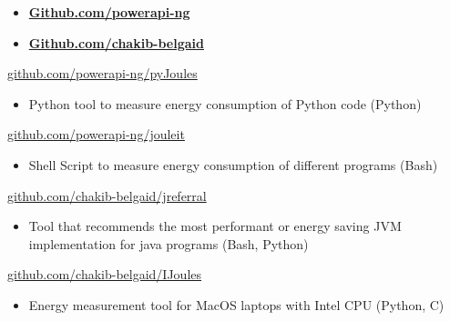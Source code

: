 \documentclass[10pt,a4paper,ragged2e,withhyper]{altacv}
\begin{document}
\begin{paracol}{2}



  \begin{itemize}
    \item   \textbf{\color{accent}\href{https://github.com/powerapi-ng}
            {Github.com/powerapi-ng}}
    \item \textbf{\color{accent}\href{https://github.com/chakib-belgaid}
            {Github.com/chakib-belgaid}}
  \end{itemize}

  \divider
   {\href{https://github.com/powerapi-ng/pyJoules}{github.com/powerapi-ng/pyJoules}}{}{}
  \begin{itemize}
    \item  Python tool to measure energy consumption of Python code (Python)
  \end{itemize}

  \divider
   {\href{https://github.com/powerapi-ng/jouleit}{github.com/powerapi-ng/jouleit}}{}{}
  \begin{itemize}
    \item  Shell Script to measure energy consumption of different programs (Bash)
  \end{itemize}

  \divider
   {\href{https://github.com/chakib-belgaid/jreferral}{github.com/chakib-belgaid/jreferral}}{}{}
  \begin{itemize}
    \item  Tool that recommends the most performant or energy saving JVM implementation for java programs (Bash, Python)
  \end{itemize}

  \divider
   {\href{https://github.com/chakib-belgaid/IJoules}{github.com/chakib-belgaid/IJoules}}{}{}
  \begin{itemize}
    \item  Energy measurement tool for MacOS laptops with Intel CPU (Python, C)
  \end{itemize}


\end{paracol}
\end{document}
